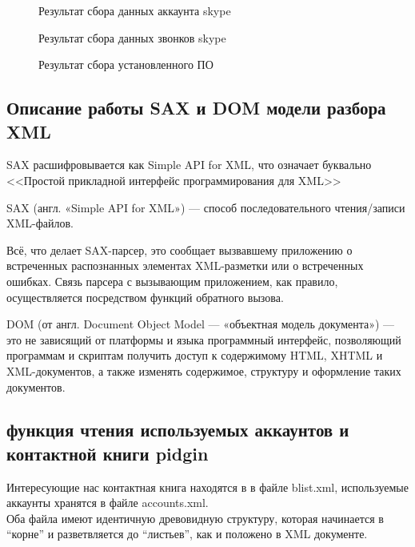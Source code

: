\begin{figure}[ht]
\caption{Результат сбора данных аккаунта skype}
\label{pic:xml_to_xslt5}
\end{figure}

\begin{figure}[ht]
\caption{Результат сбора данных звонков skype}
\label{pic:xml_to_xslt6}
\end{figure}

\begin{figure}[ht]
\caption{Результат сбора установленного ПО}
\label{pic:xml_to_xslt7}
\end{figure}

\subsection{Описание работы SAX и DOM модели разбора XML}

SAX расшифровывается как Simple API for XML, что означает буквально <<Простой прикладной интерфейс программирования для XML>>

SAX (англ. «Simple API for XML») — способ последовательного чтения/записи XML-файлов.

Всё, что делает SAX-парсер, это сообщает вызвавшему приложению о встреченных распознанных элементах XML-разметки или о встреченных ошибках. Связь парсера с вызывающим приложением, как правило, осуществляется посредством функций обратного вызова.

DOM (от англ. Document Object Model — «объектная модель документа») — это не зависящий от платформы и языка программный интерфейс, позволяющий программам и скриптам получить доступ к содержимому HTML, XHTML и XML-документов, а также изменять содержимое, структуру и оформление таких документов.\cite{valikov}

\subsection{функция чтения используемых аккаунтов и контактной книги pidgin}

Интересующие нас контактная книга находятся в %
в файле blist.xml, используемые аккаунты хранятся в файле accounts.xml.
\\Оба файла имеют идентичную древовидную структуру, которая начинается в ``корне'' и разветвляется до ``листьев'', как и положено в XML документе.

